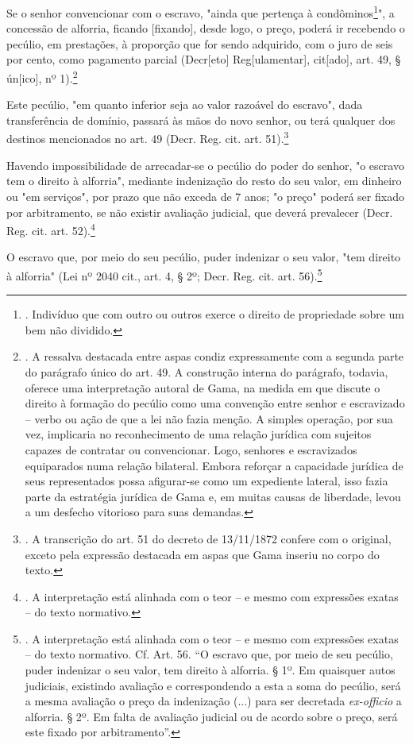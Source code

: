 Se o senhor convencionar com o escravo, "ainda que pertença à
condôminos\footnote{. Indivíduo que com outro ou outros exerce o direito
  de propriedade sobre um bem não dividido.}", a concessão de alforria,
ficando {[}fixando{]}, desde logo, o preço, poderá ir recebendo o
pecúlio, em prestações, à proporção que for sendo adquirido, com o juro
de seis por cento, como pagamento parcial (Decr{[}eto{]}
Reg{[}ulamentar{]}, cit{[}ado{]}, art. 49, § ún{[}ico{]}, nº
1).\footnote{. A ressalva destacada entre aspas condiz expressamente com
  a segunda parte do parágrafo único do art. 49. A construção interna do
  parágrafo, todavia, oferece uma interpretação autoral de Gama, na
  medida em que discute o direito à formação do pecúlio como uma
  convenção entre senhor e escravizado -- verbo ou ação de que a lei não
  fazia menção. A simples operação, por sua vez, implicaria no
  reconhecimento de uma relação jurídica com sujeitos capazes de
  contratar ou convencionar. Logo, senhores e escravizados equiparados
  numa relação bilateral. Embora reforçar a capacidade jurídica de seus
  representados possa afigurar-se como um expediente lateral, isso fazia
  parte da estratégia jurídica de Gama e, em muitas causas de liberdade,
  levou a um desfecho vitorioso para suas demandas.}

Este pecúlio, "em quanto inferior seja ao valor razoável do escravo",
dada transferência de domínio, passará às mãos do novo senhor, ou terá
qualquer dos destinos mencionados no art. 49 (Decr. Reg. cit. art.
51).\footnote{. A transcrição do art. 51 do decreto de 13/11/1872
  confere com o original, exceto pela expressão destacada em aspas que
  Gama inseriu no corpo do texto.}

Havendo impossibilidade de arrecadar-se o pecúlio do poder do senhor, "o
escravo tem o direito à alforria", mediante indenização do resto do seu
valor, em dinheiro ou "em serviços", por prazo que não exceda de 7 anos;
"o preço" poderá ser fixado por arbitramento, se não existir avaliação
judicial, que deverá prevalecer (Decr. Reg. cit. art. 52).\footnote{. A
  interpretação está alinhada com o teor -- e mesmo com expressões
  exatas -- do texto normativo.}

O escravo que, por meio do seu pecúlio, puder indenizar o seu valor,
"tem direito à alforria" (Lei nº 2040 cit., art. 4, § 2º; Decr. Reg.
cit. art. 56).\footnote{. A interpretação está alinhada com o teor -- e
  mesmo com expressões exatas -- do texto normativo. Cf. Art. 56. ``O
  escravo que, por meio de seu pecúlio, puder indenizar o seu valor, tem
  direito à alforria. § 1º. Em quaisquer autos judiciais, existindo
  avaliação e correspondendo a esta a soma do pecúlio, será a mesma
  avaliação o preço da indenização (...) para ser decretada
  \emph{ex-officio} a alforria. § 2º. Em falta de avaliação judicial ou
  de acordo sobre o preço, será este fixado por arbitramento''.}

